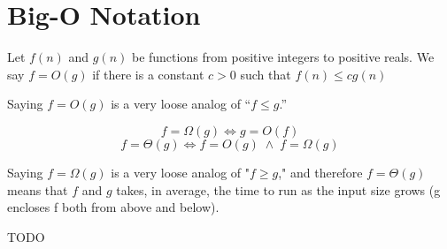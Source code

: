 \section{Big-O Notation}

\begin{definition}
Let $f(n)$ and $g(n)$ be functions from positive integers to positive reals. We say $f = O(g)$ if there is a constant $c>0$ such that $f(n)\le cg(n)$
\end{definition}
Saying $f = O(g)$ is a very loose analog of “$f \le g$.” 
\begin{definition}
\[
f=\Omega (g) \Longleftrightarrow g=O(f)
\]
\[
f=\Theta (g) \Longleftrightarrow f=O(g)\;\land\;f=\Omega(g) 
\]
\end{definition}
Saying $f = \Omega(g)$ is a very loose analog of "$f \ge g$,"
and therefore $f = \Theta(g)$ means that $f$ and $g$ takes, in average, the time to run as the input size grows (g encloses f both from above and below).


\begin{example}
\huge TODO
\end{example}